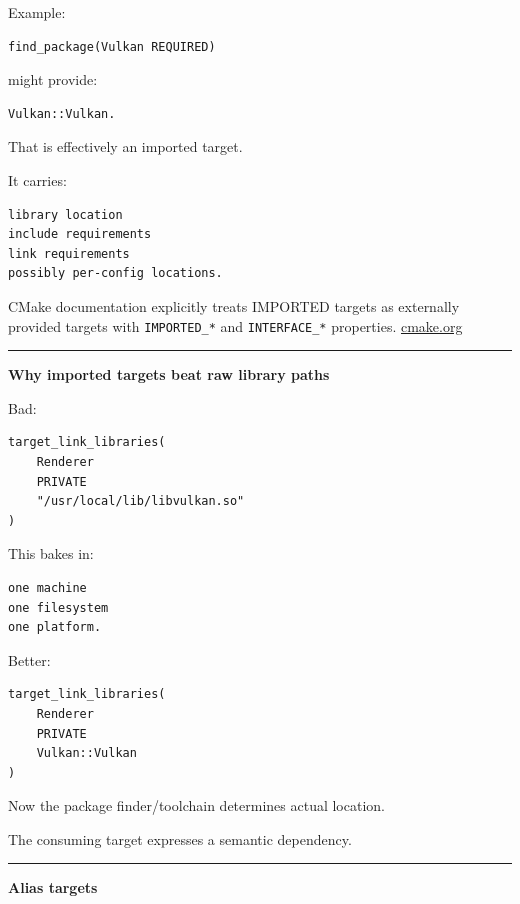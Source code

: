 Example:

\begin{verbatim}
find_package(Vulkan REQUIRED)
\end{verbatim}

might provide:

\begin{verbatim}
Vulkan::Vulkan.
\end{verbatim}

That is effectively an imported target.

It carries:

\begin{verbatim}
library location
include requirements
link requirements
possibly per-config locations.
\end{verbatim}

CMake documentation explicitly treats IMPORTED targets as externally provided targets with \texttt{IMPORTED\_*} and \texttt{INTERFACE\_*} properties. \href{https://cmake.org/cmake/help/latest/command/add_library.html?utm_source=chatgpt.com}{cmake.org}

\begin{center}\rule{0.5\linewidth}{0.5pt}\end{center}

\textbf{Why imported targets beat raw library paths}

Bad:

\begin{verbatim}
target_link_libraries(
    Renderer
    PRIVATE
    "/usr/local/lib/libvulkan.so"
)
\end{verbatim}

This bakes in:

\begin{verbatim}
one machine
one filesystem
one platform.
\end{verbatim}

Better:

\begin{verbatim}
target_link_libraries(
    Renderer
    PRIVATE
    Vulkan::Vulkan
)
\end{verbatim}

Now the package finder/toolchain determines actual location.

The consuming target expresses a semantic dependency.

\begin{center}\rule{0.5\linewidth}{0.5pt}\end{center}

\textbf{Alias targets}

